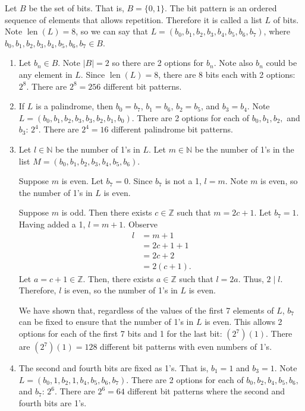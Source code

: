 \documentclass{article}
\theoremstyle{definition}
\DeclareMathOperator{\len}{len}
\begin{document}
\begin{solution}
Let $B$ be the set of bits. That is, $B=\{0,1\}$. The bit pattern is an ordered sequence of elements that allows repetition. Therefore it is called a list $L$ of bits. Note $\len(L)=8$, so we can say that $L=(b_0,b_1,b_2,b_3,b_4,b_5,b_6,b_7)$, where $b_0,b_1,b_2,b_3,b_4,b_5,b_6,b_7\in B$.
\begin{enumerate}
\item Let $b_n\in B$. Note $|B|=2$ so there are 2 options for $b_n$. Note also $b_n$ could be any element in $L$. Since $\len(L)=8$, there are 8 bits each with 2 options: $2^8$. There are $2^8=256$ different bit patterns.
\item If $L$ is a palindrome, then $b_0=b_7$, $b_1=b_6$, $b_2=b_5$, and $b_3=b_4$. Note $L=(b_0,b_1,b_2,b_3,b_3,b_2,b_1,b_0)$. There are 2 options for each of $b_0,b_1,b_2,$ and $b_3$: $2^4$. There are $2^4=16$ different palindrome bit patterns.
\item  Let $l\in\mathbb{N}$ be the number of 1's in $L$. Let $m\in\mathbb{N}$ be the number of 1's in the list $M=(b_0,b_1,b_2,b_3,b_4,b_5,b_6)$.

Suppose $m$ is even. Let $b_7=0$. Since $b_7$ is not a 1, $l=m$. Note $m$ is even, so the number of 1's in $L$ is even.

Suppose $m$ is odd. Then there exists $c\in\mathbb{Z}$ such that $m=2c+1$. Let $b_7=1$. Having added a 1, $l=m+1$. Observe
\begin{align*}
l
&=m+1\\
&=2c+1+1\\
&=2c+2\\
&=2(c+1).
\end{align*}
Let $a=c+1\in\mathbb{Z}$. Then, there exists $a\in\mathbb{Z}$ such that $l=2a$. Thus, $2 \mid l$. Therefore, $l$ is even, so the number of 1's in $L$ is even.

We have shown that, regardless of the values of the first 7 elements of $L$, $b_7$ can be fixed to ensure that the number of 1's in $L$ is even. This allows 2 options for each of the first 7 bits and 1 for the last bit: $\left(2^7\right)(1)$. There are $\left(2^7\right)(1)=128$ different bit patterns with even numbers of 1's.

\item The second and fourth bits are fixed as 1's. That is, $b_1=1$ and $b_3=1$. Note $L=(b_0,1,b_2,1,b_4,b_5,b_6,b_7)$. There are 2 options for each of $b_0,b_2,b_4,b_5,b_6,$ and $b_7$: $2^6$. There are $2^6=64$ different bit patterns where the second and fourth bits are 1's.


\end{enumerate}
\end{solution}
\end{document}
